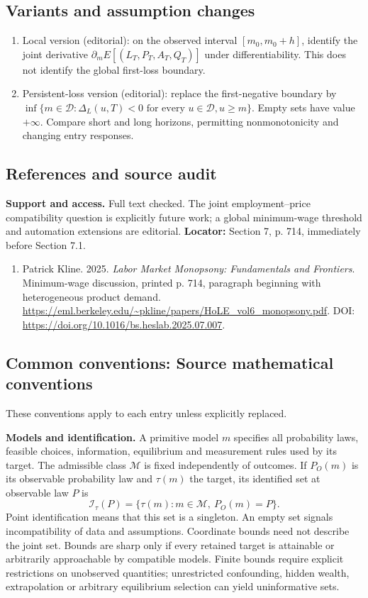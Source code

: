 \documentclass[11pt,a4paper]{article}
\begin{document}
\subsection*{Variants and assumption changes}
\begin{enumerate}
\item Local version (editorial): on the observed interval \([m_0,m_0+h]\), identify the joint derivative \(\partial_mE[(L_T,P_T,A_T,Q_T)]\) under differentiability. This does not identify the global first-loss boundary.
\item Persistent-loss version (editorial): replace the first-negative boundary by \(\inf\{m\in\mathcal D:\Delta_L(u,T)<0\text{ for every }u\in\mathcal D,u\ge m\}\). Empty sets have value \(+\infty\). Compare short and long horizons, permitting nonmonotonicity and changing entry responses.
\end{enumerate}
\subsection*{References and source audit}
\textbf{Support and access.} Full text checked. The joint employment--price compatibility question is explicitly future work; a global minimum-wage threshold and automation extensions are editorial. \textbf{Locator:} Section 7, p. 714, immediately before Section 7.1.
\begin{enumerate}\raggedright
\item\hypertarget{definitions:source:30007633:1}{} Patrick Kline. 2025. \emph{Labor Market Monopsony: Fundamentals and Frontiers}. Minimum-wage discussion, printed p. 714, paragraph beginning with heterogeneous product demand.
\url{https://eml.berkeley.edu/~pkline/papers/HoLE_vol6_monopsony.pdf}.
DOI: \url{https://doi.org/10.1016/bs.heslab.2025.07.007}.
\end{enumerate}

\subsection*{Common conventions: Source mathematical conventions}

These conventions apply to each entry unless explicitly replaced.

\textbf{Models and identification.} A primitive model \(m\) specifies all probability laws, feasible choices, information, equilibrium and measurement rules used by its target. The admissible class \(\mathcal M\) is fixed independently of outcomes. If \(P_O(m)\) is its observable probability law and \(\tau(m)\) the target, its identified set at observable law \(P\) is
\[
 \mathcal I_\tau(P)=\{\tau(m):m\in\mathcal M,\ P_O(m)=P\}.
\]
Point identification means that this set is a singleton. An empty set signals incompatibility of data and assumptions. Coordinate bounds need not describe the joint set. Bounds are sharp only if every retained target is attainable or arbitrarily approachable by compatible models. Finite bounds require explicit restrictions on unobserved quantities; unrestricted confounding, hidden wealth, extrapolation or arbitrary equilibrium selection can yield uninformative sets.
\end{document}
